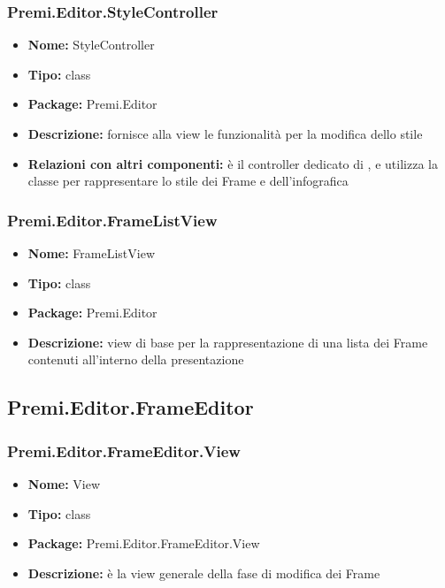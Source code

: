 \subsubsection{Premi.Editor.StyleController}
\begin{itemize}
  \item \textbf{Nome:} StyleController
  \item \textbf{Tipo:} class
  \item \textbf{Package:} Premi.Editor
  \item \textbf{Descrizione:} fornisce alla view le funzionalità per la modifica dello stile
  \item \textbf{Relazioni con altri componenti:} è il controller dedicato di  ,  e utilizza la classe  per rappresentare lo stile dei Frame e dell'infografica
\end{itemize}
\subsubsection{Premi.Editor.FrameListView}
\begin{itemize}
  \item \textbf{Nome:} FrameListView
  \item \textbf{Tipo:} class
  \item \textbf{Package:} Premi.Editor
  \item \textbf{Descrizione:} view di base per la rappresentazione di una lista dei Frame contenuti all'interno della presentazione
\end{itemize}



\subsection{Premi.Editor.FrameEditor}
\subsubsection{Premi.Editor.FrameEditor.View}
\begin{itemize}
  \item \textbf{Nome:} View
  \item \textbf{Tipo:} class
  \item \textbf{Package:} Premi.Editor.FrameEditor.View
  \item \textbf{Descrizione:} è la view generale della fase di modifica dei Frame
\end{itemize}
